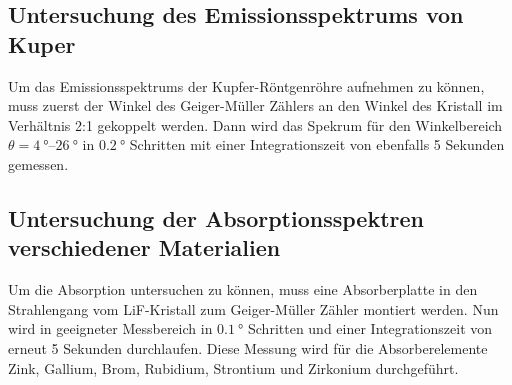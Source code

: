 \subsection{Untersuchung des Emissionsspektrums von Kuper}
\label{ssec:emission}

Um das Emissionsspektrums der Kupfer-Röntgenröhre aufnehmen zu können, muss zuerst der Winkel des Geiger-Müller Zählers an den Winkel des Kristall im Verhältnis 2:1 gekoppelt werden.
Dann wird das Spekrum für den Winkelbereich $\theta=\SIrange{4}{26}{\degree}$ in $\SI{0.2}{\degree}$ Schritten mit einer Integrationszeit von ebenfalls 5 Sekunden gemessen.

\subsection{Untersuchung der Absorptionsspektren verschiedener Materialien}
\label{ssec:absorption}

Um die Absorption untersuchen zu können, muss eine Absorberplatte in den Strahlengang vom LiF-Kristall zum Geiger-Müller Zähler montiert werden.
Nun wird in geeigneter Messbereich in $\SI{0.1}{\degree}$ Schritten und einer Integrationszeit von erneut 5 Sekunden durchlaufen.
Diese Messung wird für die Absorberelemente Zink, Gallium, Brom, Rubidium, Strontium und Zirkonium durchgeführt.